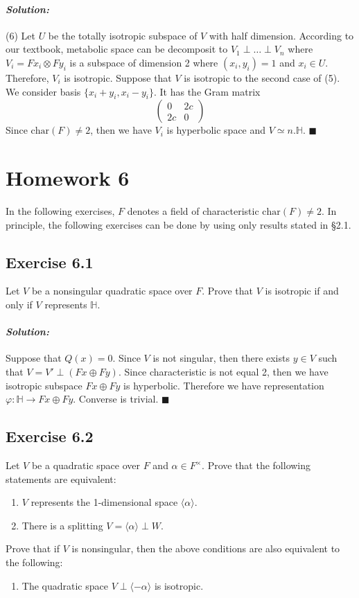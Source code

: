 \documentclass[12pt, a4paper]{article}
\newenvironment{solution}
  {\paragraph{\textit{Solution:}}\par\medskip}
  {\hfill$\blacksquare$\vspace{0.1cm}}
\begin{document}
\begin{solution}
    (6)  Let $U$ be the totally isotropic subspace of $V$ with half dimension.
    According to our textbook, metabolic space can be decomposit to $V_1\perp \dots \perp V_n$ where $V_i=Fx_i\otimes Fy_i$ is a subspace of dimension 2 where $(x_i,y_i)=1$ and $x_i\in U$.
    Therefore, $V_i$ is isotropic. 
    Suppose that $V$ is isotropic to the second case of (5). 
    We consider basis $\{x_i+y_i,x_i-y_i\}$. It has the Gram matrix
    $$ \begin{pmatrix} 0 & 2c \\ 2c & 0 \end{pmatrix} $$
    Since $\text{char}(F)\neq 2$, then we have $V_i$ is hyperbolic space and $V\simeq n.\mathbb{H}$.
\end{solution}


\section*{Homework 6}

In the following exercises, $F$ denotes a field of characteristic $\text{char}(F)\neq 2$. 
In principle, the following exercises can be done by using only results stated in \S 2.1.

\subsection*{Exercise 6.1}
Let $V$ be a nonsingular quadratic space over $F$. Prove that $V$ is isotropic if and only if $V$ represents $\mathbb{H}$.
\begin{solution}
    Suppose that $Q(x)=0$. Since $V$ is not singular, then there exists $y\in V$ such that $V = V'\perp(Fx\oplus Fy)$. Since characteristic is not equal 2, then we have isotropic subspace $Fx\oplus Fy$ is hyperbolic.
    Therefore we have representation $\varphi:\mathbb{H} \to Fx\oplus Fy$.
    Converse is trivial.
\end{solution}


\subsection*{Exercise 6.2}
Let $V$ be a quadratic space over $F$ and $\alpha \in F^\times$. Prove that the following statements are equivalent:
\begin{enumerate}
    \item[(i)] $V$ represents the 1-dimensional space $\langle \alpha \rangle$.
    \item[(ii)] There is a splitting $V = \langle \alpha \rangle \perp W$.
\end{enumerate}
Prove that if $V$ is nonsingular, then the above conditions are also equivalent to the following:
\begin{enumerate}
    \item[(iii)] The quadratic space $V \perp \langle -\alpha \rangle$ is isotropic.
\end{enumerate}
\end{document}
